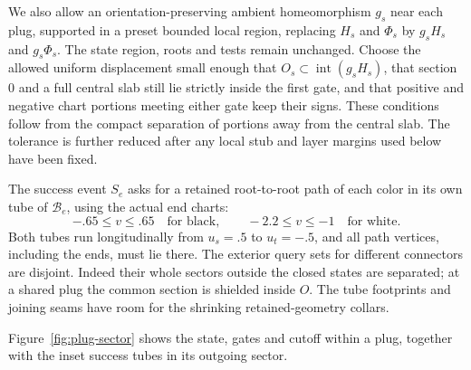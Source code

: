 We also allow an orientation-preserving ambient homeomorphism $g_s$ near
each plug, supported in a preset bounded local region, replacing $H_s$
and $\Phi_s$ by $g_sH_s$ and $g_s\Phi_s$.  The state region, roots and
tests remain unchanged.  Choose the allowed uniform displacement small
enough that $O_s\subset\operatorname{int}(g_sH_s)$, that section $0$ and
a full central slab still lie strictly inside the first gate, and that
positive and negative chart portions meeting either gate keep their
signs.  These conditions follow from the compact separation of portions
away from the central slab.  The tolerance is further reduced after any
local stub and layer margins used below have been fixed.

The success event $S_e$ asks for a retained root-to-root path of each
color in its own tube of $\mathcal B_e$, using the actual end charts:
\[
 -.65\le v\le .65\quad\text{for black},\qquad
 -2.2\le v\le-1\quad\text{for white}.
\]
Both tubes run longitudinally from $u_s=.5$ to $u_t=-.5$, and all path
vertices, including the ends, must lie there.  The exterior query sets
for different connectors are disjoint.  Indeed their whole sectors
outside the closed states are separated; at a shared plug the common
section is shielded inside $O$.  The tube footprints and joining seams
have room for the shrinking retained-geometry collars.

Figure~\ref{fig:plug-sector} shows the state, gates and cutoff within a
plug, together with the inset success tubes in its outgoing sector.

